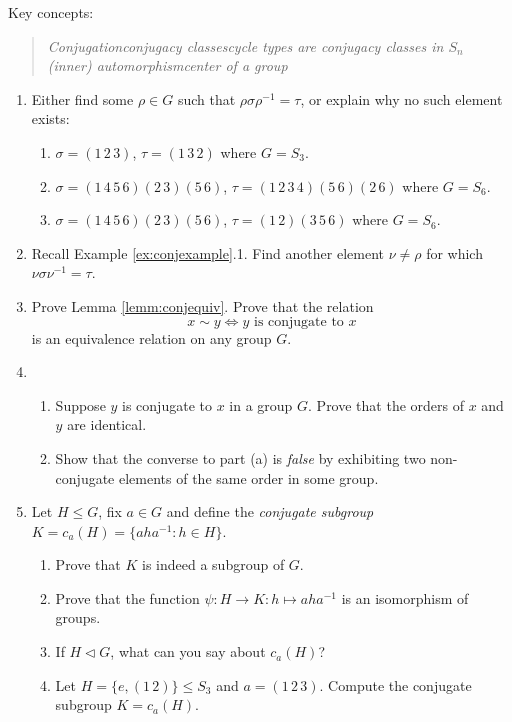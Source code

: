 \goodbreak

\begin{exercises}{}{}
	Key concepts:
	\begin{quote}
		\emph{Conjugation\qquad conjugacy classes\qquad cycle types are conjugacy classes in $S_n$\\
		(inner) automorphism\qquad center of a group}
	\end{quote}
	
	\begin{enumerate}    
	  \item Either find some $\rho\in G$ such that $\rho\sigma\rho^{-1}=\tau$, or explain why no such element exists:
		\begin{enumerate}
	  	\item $\sigma=(1\,2\,3)$, $\tau=(1\,3\,2)$ where $G=S_3$.
	  	\item $\sigma=(1\,4\,5\,6)(2\,3)(5\,6)$, $\tau=(1\,2\,3\,4)(5\,6)(2\,6)$ where $G=S_6$.
	  	\item $\sigma=(1\,4\,5\,6)(2\,3)(5\,6)$, $\tau=(1\,2)(3\,5\,6)$ where $G=S_6$.
		\end{enumerate}
		
		
	  \item Recall Example \ref{ex:conjexample}.1. Find another element $\nu\neq\rho$ for which $\nu\sigma\nu^{-1}=\tau$.
	  
	  
	  \item Prove Lemma \ref{lemm:conjequiv}. Prove that the relation
	  \[
	  	x\sim y\iff \text{$y$ is conjugate to $x$}
	  \]
	  is an equivalence relation on any group $G$. 
	  
	
		\item\begin{enumerate}
	  	\item Suppose $y$ is conjugate to $x$ in a group $G$. Prove that the orders of $x$ and $y$ are identical.
	  	\item Show that the converse to part (a) is \emph{false} by exhibiting two non-conjugate elements of the same order in some group.
		\end{enumerate}
	
	
		\item Let $H\le G$, fix $a\in G$ and define the \emph{conjugate subgroup} $K=c_a(H)=\{aha^{-1}:h\in H\}$.
	  \begin{enumerate}
	    \item Prove that $K$ is indeed a subgroup of $G$.
	    \item Prove that the function $\psi:H\to K:h\mapsto aha^{-1}$ is an isomorphism of groups.
	    \item If $H\triangleleft G$, what can you say about $c_a(H)$?
	    \item Let $H=\{e,(1\,2)\}\le S_3$ and $a=(1\,2\,3)$. Compute the conjugate subgroup $K=c_a(H)$.
	  \end{enumerate}
	  

\end{enumerate}
\end{exercises}
